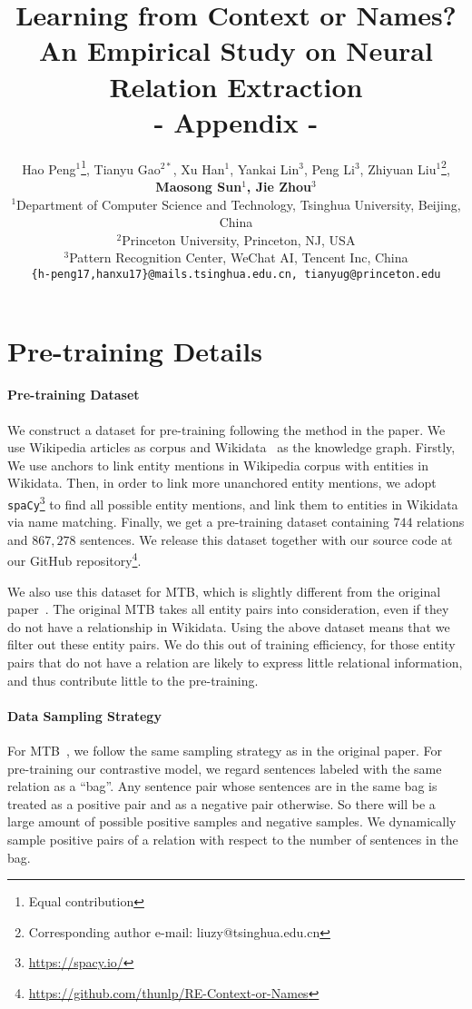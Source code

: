 \documentclass[11pt,a4paper]{article}
\title{Learning from Context or Names?\\An Empirical Study on Neural Relation Extraction \\
- Appendix -}
\author{Hao Peng$^{1}$\thanks{\quad Equal contribution}\hspace{0.5em}, Tianyu Gao$^{2*}$, Xu Han$^{1}$, Yankai Lin$^{3}$, Peng Li$^{3}$, Zhiyuan Liu$^{1}$\thanks{\quad Corresponding author e-mail: liuzy@tsinghua.edu.cn}\hspace{0.5em},  \\\textbf{Maosong Sun$^{1}$, Jie Zhou$^{3}$}\\
$^1$Department of Computer Science and Technology, Tsinghua University, Beijing, China\\
$^2$Princeton University, Princeton, NJ, USA\\
$^3$Pattern Recognition Center, WeChat AI, Tencent Inc, China\\
{\tt \{h-peng17,hanxu17\}@mails.tsinghua.edu.cn, tianyug@princeton.edu}
}
\begin{document}
\maketitle

\appendix

\section{Pre-training Details} 
\label{appendix:pretraining}

\paragraph{Pre-training Dataset} We construct a dataset for pre-training following the method in the paper. We use Wikipedia articles as corpus and Wikidata~\citep{vrandevcic2014wikidata} as the knowledge graph. Firstly, We 
use anchors to link entity mentions in Wikipedia corpus with entities in Wikidata. Then, in order to link more unanchored entity mentions, we adopt \texttt{spaCy}\footnote{\url{https://spacy.io/}} to find all possible entity mentions, and link them to entities in Wikidata via name matching. Finally, we get a pre-training dataset containing $744$ relations and $867,278$ sentences. We release this dataset together with our source code at our GitHub repository\footnote{\url{https://github.com/thunlp/RE-Context-or-Names}}.

We also use this dataset for MTB, which is slightly different from the original paper~\citep{soares2019matching}. The original MTB takes all entity pairs into consideration, even if they do not have a relationship in Wikidata. Using the above dataset means that we filter out these entity pairs. We do this out of training efficiency, for those entity pairs that do not have a relation are likely to express little relational information, and thus contribute little to the pre-training.

\paragraph{Data Sampling Strategy} For MTB~\citep{soares2019matching}, we follow the same sampling strategy as in the original paper.
For pre-training our contrastive model, we regard sentences labeled with the same relation as a ``bag''. Any sentence pair whose sentences are in the same bag is treated as a positive pair and as a negative pair otherwise. So there will be a large amount of possible positive samples and negative samples. We dynamically sample positive pairs of a relation with respect to the number of sentences in the bag. 
\end{document}
